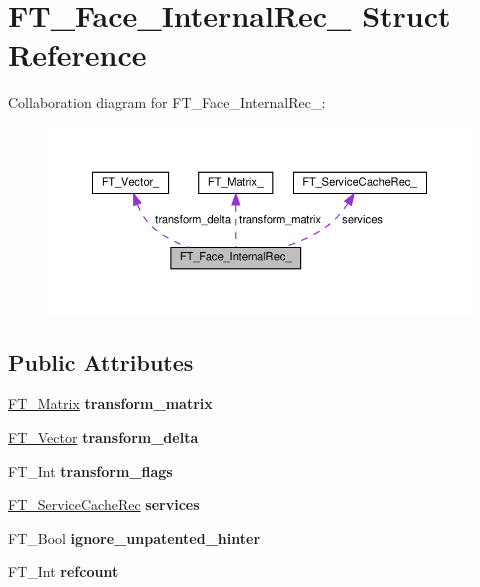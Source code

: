 \hypertarget{structFT__Face__InternalRec__}{}\section{F\+T\+\_\+\+Face\+\_\+\+Internal\+Rec\+\_\+ Struct Reference}
\label{structFT__Face__InternalRec__}


Collaboration diagram for F\+T\+\_\+\+Face\+\_\+\+Internal\+Rec\+\_\+\+:
\nopagebreak
\begin{figure}[H]
\begin{center}
\leavevmode
\includegraphics[width=350pt]{structFT__Face__InternalRec____coll__graph}
\end{center}
\end{figure}
\subsection*{Public Attributes}
\begin{DoxyCompactItemize}
\item 
\mbox{\label{structFT__Face__InternalRec___ab4be2dcda098e6136f5701580d18032d}} 
\hyperlink{structFT__Matrix__}{F\+T\+\_\+\+Matrix} {\bfseries transform\+\_\+matrix}
\item 
\mbox{\label{structFT__Face__InternalRec___ab6c2aacdac58312273395b21b8d168c6}} 
\hyperlink{structFT__Vector__}{F\+T\+\_\+\+Vector} {\bfseries transform\+\_\+delta}
\item 
\mbox{\label{structFT__Face__InternalRec___a2495aced35040e1b7c2bc0afcd7a920d}} 
F\+T\+\_\+\+Int {\bfseries transform\+\_\+flags}
\item 
\mbox{\label{structFT__Face__InternalRec___abc3acb3bf5db056bb9c549af04f07963}} 
\hyperlink{structFT__ServiceCacheRec__}{F\+T\+\_\+\+Service\+Cache\+Rec} {\bfseries services}
\item 
\mbox{\label{structFT__Face__InternalRec___af898fd754c36c3f34c9ce0e88eb101c9}} 
F\+T\+\_\+\+Bool {\bfseries ignore\+\_\+unpatented\+\_\+hinter}
\item 
\mbox{\label{structFT__Face__InternalRec___a353601751cba38cf1d4c2e700339190e}} 
F\+T\+\_\+\+Int {\bfseries refcount}
\end{DoxyCompactItemize}


